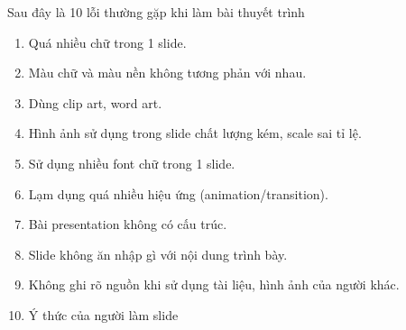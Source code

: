 Sau đây là 10 lỗi thường gặp khi làm bài thuyết trình

\begin{enumerate}
  \item Quá nhiều chữ trong 1 slide.
  \item Màu chữ và màu nền không tương phản với nhau.
  \item Dùng clip art, word art.
  \item Hình ảnh sử dụng trong slide chất lượng kém, scale sai tỉ lệ.
  \item Sử dụng nhiều font chữ trong 1 slide.
  \item Lạm dụng quá nhiều hiệu ứng (animation/transition).
  \item Bài presentation không có cấu trúc.
  \item Slide không ăn nhập gì với nội dung trình bày.
  \item Không ghi rõ nguồn khi sử dụng tài liệu, hình ảnh của người khác.
  \item Ý thức của người làm slide
\end{enumerate}
